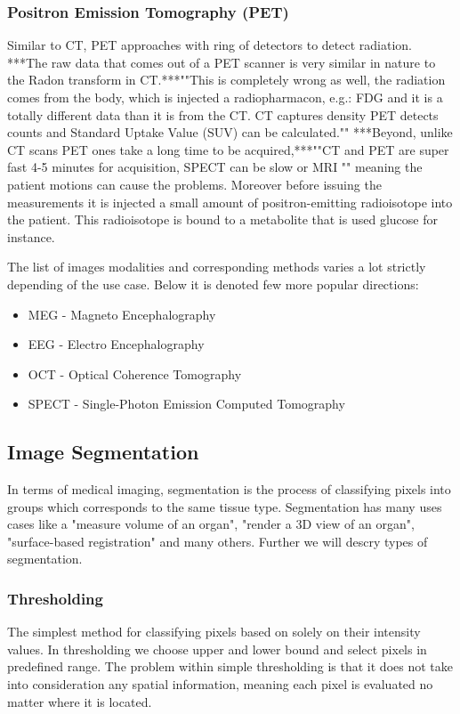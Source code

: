 \subsubsection{Positron Emission Tomography (PET)}      
Similar to CT, PET approaches with ring of detectors to detect radiation. ***The raw data that comes out of a PET scanner is very similar in nature to the Radon transform in CT.***""This is completely wrong as well, the radiation comes from the body, which is injected a radiopharmacon, e.g.: FDG and it is a totally different data than it is from the CT. CT captures density PET detects counts and Standard Uptake Value (SUV) can be calculated."" ***Beyond, unlike CT scans PET ones take a long time to be acquired,***""CT and PET are super fast 4-5 minutes for acquisition, SPECT can be slow or MRI "" meaning the patient motions can cause the problems. Moreover before issuing the measurements it is injected a small amount of positron-emitting radioisotope into the patient. This radioisotope is bound to a metabolite that is used glucose for instance.        

The list of images modalities and corresponding methods varies a lot strictly depending of the use case.
Below it is denoted few more popular directions:
\begin{itemize}
    \item MEG - Magneto Encephalography
    \item EEG - Electro Encephalography
    \item OCT - Optical Coherence Tomography
    \item SPECT - Single-Photon Emission Computed Tomography
\end{itemize}


\subsection{Image Segmentation}
In terms of medical imaging, segmentation is the process of classifying pixels into groups which corresponds to the same tissue type. Segmentation has many uses cases like a "measure volume of an organ", "render a 3D view of an organ", "surface-based registration" and many others. Further we will descry types of segmentation. 

\subsubsection{Thresholding}
The simplest method for classifying pixels based on solely on their intensity values. In thresholding we choose upper and lower bound and select pixels in predefined range.
The problem within simple thresholding is that it does not take into consideration any spatial information, meaning each pixel is evaluated no matter where it is located.    

